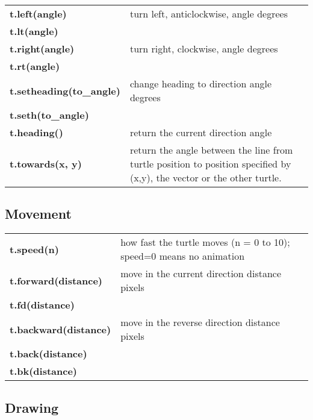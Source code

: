 \documentclass{article}
\begin{document}
\begin{tabularx}{\textwidth}{p{}X}
\textbf{t.left(angle)} & turn left, anticlockwise, angle degrees \\
\textbf{t.lt(angle)} &  \\
\textbf{t.right(angle)} & turn right, clockwise, angle degrees \\
\textbf{t.rt(angle)} & \\
\textbf{t.setheading(to\_angle)} & change heading to direction angle degrees \\
\textbf{t.seth(to\_angle)} & \\
\textbf{t.heading()} & return the current direction angle \\
\textbf{t.towards(x, y)} & return the angle between the line from turtle position to position specified by (x,y), the vector or the other turtle. \\
\end{tabularx}

\subsection*{Movement}

\begin{tabularx}{\textwidth}{p{}X}
\textbf{t.speed(n)} & how fast the turtle moves (n = 0 to 10); speed=0 means no animation \\
\textbf{t.forward(distance)} & move in the current direction distance pixels \\
\textbf{t.fd(distance)} & \\
\textbf{t.backward(distance)} & move in the reverse direction distance pixels \\
\textbf{t.back(distance)} & \\
\textbf{t.bk(distance)} 
\end{tabularx}

\subsection*{Drawing}
\end{document}

